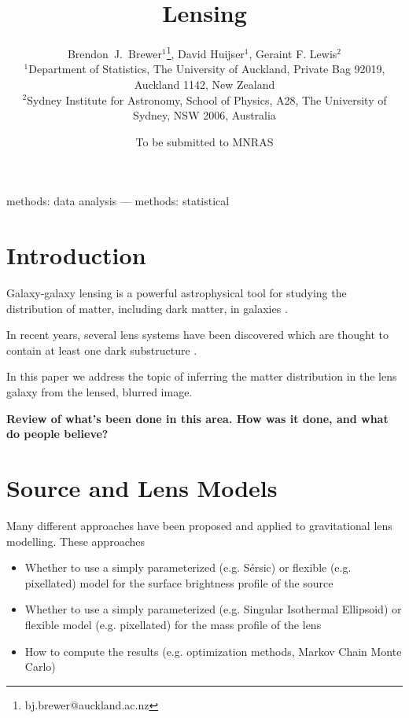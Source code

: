 \documentclass[useAMS,usenatbib]{mn2e}
\title[]
{Lensing}
\author[Brewer, Huijser and Lewis]{%
  Brendon~J.~Brewer$^{1}$\thanks{bj.brewer@auckland.ac.nz},
  David Huijser$^{1}$,
  Geraint F. Lewis$^2$
  \medskip\\
  $^1$Department of Statistics, The University of Auckland, Private Bag 92019, Auckland 1142, New Zealand\\
  $^2$Sydney Institute for Astronomy, School of Physics, A28,
  The University of Sydney, NSW 2006, Australia}
\begin{document}
             
\date{To be submitted to MNRAS}
             
\maketitle

\label{firstpage}

\begin{abstract}

\end{abstract}


\begin{keywords}
methods: data analysis --- methods: statistical
\end{keywords}

\section{Introduction}
Galaxy-galaxy lensing is a powerful astrophysical tool for studying
the distribution of matter, including dark matter, in galaxies
\citep{treu}.

In recent years, several lens systems have been discovered which
are thought to contain at least one dark substructure
\citep{vegetti1, vegetti2, vegetti3}.

In this paper we address the topic of inferring the matter distribution in the
lens galaxy from the lensed, blurred image.

{\bf Review of what's been done in this area. How was it done, and what do
people believe?}

\section{Source and Lens Models}
Many different approaches have been proposed and applied to gravitational lens
modelling. These approaches 
\begin{itemize}
\item Whether to use a simply parameterized (e.g. Sérsic)
or flexible (e.g. pixellated) model for the surface brightness profile of the source
\item Whether to use a simply parameterized (e.g. Singular Isothermal Ellipsoid)
or flexible model (e.g. pixellated) for the mass profile of the lens
\item How to compute the results (e.g. optimization methods, Markov Chain
Monte Carlo)
\end{itemize}
\end{document}
